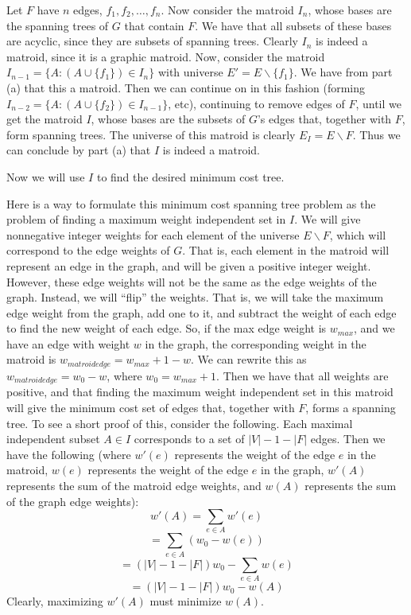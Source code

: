 \documentclass{article}
\begin{document}
\begin{description}
        Let $F$ have $n$ edges, $f_1, f_2,\dots, f_n$. Now consider the matroid $I_n$, whose bases are
        the spanning trees of $G$ that contain $F$. We have that all subsets of
        these bases are acyclic, since they are subsets of spanning trees.
        Clearly $I_n$ is indeed a matroid, since it is a graphic matroid. Now,
        consider the matroid $I_{n-1} = \{A : (A \cup \{f_1\}) \in I_n\}$ with
        universe $E' = E \backslash \{f_1\}$. We
        have from part (a) that this a matroid. Then we can continue on in this
        fashion (forming $I_{n-2} = \{A : (A \cup \{f_2\}) \in I_{n-1}\}$, etc),
        continuing to remove edges of $F$,
        until we get the matroid $I$, whose bases are the subsets of $G$'s edges
        that, together with $F$, form spanning trees. The universe of this
        matroid is clearly $E_I = E \backslash F$. Thus we can conclude by
        part (a) that $I$ is indeed a matroid.


        \vspace{8mm}
        Now we will use $I$ to find the desired minimum cost tree.

         Here is a way to formulate this minimum cost spanning tree problem as the
        problem of finding a maximum weight independent set in $I$. We will
        give nonnegative integer
        weights for each element of the universe $E \backslash F$, which will correspond to the
        edge weights of $G$. That is, each element in the matroid will
        represent an edge in the graph, and will be given a positive integer weight.
        However, these edge weights will not be the
        same as the edge weights of the graph. Instead, we will ``flip'' the
        weights. That is, we will take the maximum edge weight from the graph,
        add one to it,
        and subtract the weight of each edge to find the new weight of each
        edge. So, if the max edge weight is $w_{max}$, and we have an edge with
        weight $w$ in the graph, the corresponding weight in the matroid is $w_{matroid edge} =
        w_{max} + 1 - w$. We can rewrite this as $w_{matroid edge} = w_0 - w$, where
        $w_0 = w_{max} + 1$.
        Then we have that all weights are positive,
        and that finding the maximum weight independent set in this
        matroid will give the minimum cost set of edges that, together with $F$,
        forms a spanning tree.
        To see a short proof of this, consider the
        following. Each maximal independent subset $A \in I$ corresponds to a set of
        $|V| - 1 - |F|$ edges. Then we have the following (where $w'(e)$
        represents the weight of the edge $e$ in the matroid, $w(e)$ represents the
        weight of the edge $e$ in the graph, $w'(A)$ represents the sum of the
        matroid edge weights, and $w(A)$ represents the sum of the graph edge
        weights):
        \[ w'(A) = \sum_{e \in A} w'(e) \]
        \[ = \sum_{e \in A} (w_0 - w(e)) \]
        \[ = (|V| - 1 - |F|)w_0 - \sum_{e \in A} w(e) \]
        \[ = (|V| - 1 - |F|)w_0 - w(A) \]
        Clearly, maximizing $w'(A)$ must minimize $w(A)$.


\end{description}
\end{document}
